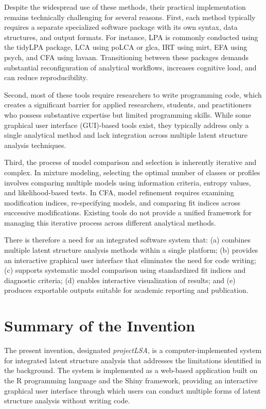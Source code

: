 \documentclass[12pt,a4paper]{article}
\begin{document}
Despite the widespread use of these methods, their practical implementation remains technically challenging for several reasons. First, each method typically requires a separate specialized software package with its own syntax, data structures, and output formats. For instance, LPA is commonly conducted using the tidyLPA package, LCA using poLCA or glca, IRT using mirt, EFA using psych, and CFA using lavaan. Transitioning between these packages demands substantial reconfiguration of analytical workflows, increases cognitive load, and can reduce reproducibility.

Second, most of these tools require researchers to write programming code, which creates a significant barrier for applied researchers, students, and practitioners who possess substantive expertise but limited programming skills. While some graphical user interface (GUI)-based tools exist, they typically address only a single analytical method and lack integration across multiple latent structure analysis techniques.

Third, the process of model comparison and selection is inherently iterative and complex. In mixture modeling, selecting the optimal number of classes or profiles involves comparing multiple models using information criteria, entropy values, and likelihood-based tests. In CFA, model refinement requires examining modification indices, re-specifying models, and comparing fit indices across successive modifications. Existing tools do not provide a unified framework for managing this iterative process across different analytical methods.

There is therefore a need for an integrated software system that: (a) combines multiple latent structure analysis methods within a single platform; (b) provides an interactive graphical user interface that eliminates the need for code writing; (c) supports systematic model comparison using standardized fit indices and diagnostic criteria; (d) enables interactive visualization of results; and (e) produces exportable outputs suitable for academic reporting and publication.

\section{Summary of the Invention}

The present invention, designated \textit{projectLSA}, is a computer-implemented system for integrated latent structure analysis that addresses the limitations identified in the background. The system is implemented as a web-based application built on the R programming language and the Shiny framework, providing an interactive graphical user interface through which users can conduct multiple forms of latent structure analysis without writing code.
\end{document}
